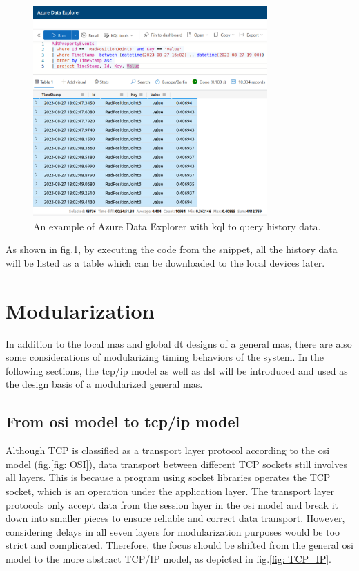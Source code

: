 \begin{figure}[htb]
    \centering
    \includegraphics[width=0.8\textwidth]{figures/KQL_cut.jpg}
    \caption{An example of Azure Data Explorer with \gls{kql} to 
    query history data.\label{fig: KQL}}
\end{figure}

As shown in fig.\ref{fig: KQL}, by executing the code from the snippet, all the history data will be listed as a table 
which can be downloaded to the local devices later. 




\section{Modularization}\label{chap: Meth-Modular}
In addition to the local \gls{mas} and global \gls{dt} designs of a general \gls{mas}, 
there are also some considerations of modularizing timing behaviors of the 
system. In the following sections, the \gls{tcp/ip} model as well as 
\gls{dsl} will be introduced and used as the design basis of a modularized general 
\gls{mas}. 
\subsection{From \gls{osi} model to \gls{tcp/ip} model}

Although TCP is classified as a transport layer protocol according to the 
\gls{osi} model (fig.\ref{fig: OSI}), data transport between different TCP sockets 
still involves all layers. This is because a program using socket libraries 
operates the TCP socket, which is an operation under the application layer. 
The transport layer protocols only accept data from the session layer in the 
\gls{osi} model and break it down into smaller pieces to ensure reliable and correct 
data transport. However, considering delays in all seven layers for modularization 
purposes would be too strict and complicated. Therefore, the focus should be 
shifted from the general \gls{osi} model to the more abstract TCP/IP model, as depicted 
in fig.\ref{fig: TCP_IP}.

